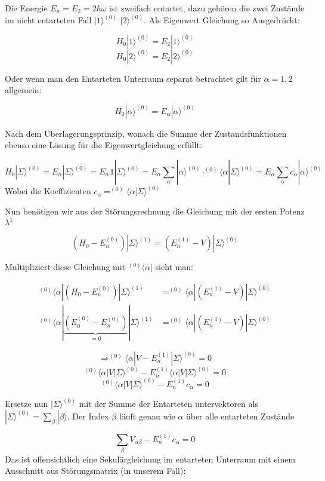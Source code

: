 Die Energie \(E_n = E_2 = 2\hbar\omega\) ist zweifach entartet, dazu gehören die zwei Zustände im nicht entarteten Fall \(|1\rangle^{(0)} \)  \(|2\rangle^{(0)} \). Als Eigenwert Gleichung so Ausgedrückt:

\[H_0 |1\rangle^{(0)} = E_2 |1\rangle^{(0)} \]
\[H_0 |2\rangle^{(0)} = E_2 |2\rangle^{(0)} \]

Oder wenn man den Entarteten Unterraum separat betrachtet gilt für \(\alpha=1,2\) allgemein:

\[H_0 |\alpha\rangle^{(0)} = E_\alpha |\alpha\rangle^{(0)} \]

Nach dem Überlagerungsprinzip, wonach die Summe der Zustandsfunktionen ebenso eine Lösung für die Eigenwertgleichung erfüllt:

\[H_0 |\Sigma \rangle^{(0)} = E_\alpha |\Sigma\rangle^{(0)} = E_\alpha \mathbb 1 |\Sigma\rangle^{(0)} =  E_\alpha \sum_\alpha |\alpha\rangle^{(0)} \cdot^{(0)}\langle \alpha |\Sigma\rangle^{(0)} = E_\alpha \sum_\alpha c_\alpha|\alpha\rangle ^{(0)} \]
Wobei die Koeffizienten \(c_\alpha =  ^{(0)} \langle \alpha |\Sigma\rangle^{(0)}\)

Nun benötigen wir aus der Störungsrechnung die Gleichung mit der ersten Potenz \(\lambda^1\)

\[(H_0-E_n^{(0)})|\Sigma\rangle ^{(1)} = (E_n^{(1)}-V)|\Sigma\rangle^{(0)}\]

Multipliziert diese Gleichung mit \(^{(0)}\langle \alpha|\) sieht man:

\begin{align}
^{(0)}\langle \alpha|(H_0-E_n^{(0)})|\Sigma\rangle ^{(1)} &= ^{(0)}\langle \alpha|(E_n^{(1)}-V)|\Sigma\rangle^{(0)}\\
^{(0)}\langle \alpha|\underbrace{(E_0^{(0)}-E_n^{(0)})}_{=0}|\Sigma\rangle ^{(1)} &=^{(0)}\langle \alpha| (E_n^{(1)}-V)|\Sigma\rangle^{(0)}
\end{align}

\[\Rightarrow  ^{(0)} \langle \alpha|V-E_n^{(1)}|\Sigma\rangle^{(0)} = 0 \]
\[  ^{(0)} \langle \alpha|V|\Sigma\rangle^{(0)} -E_n^{(1)} \langle \alpha|V|\Sigma\rangle^{(0)}  = 0 \]
\[  ^{(0)} \langle \alpha|V|\Sigma\rangle^{(0)} -E_n^{(1)} c_\alpha  = 0 \]


Ersetze nun \(|\Sigma\rangle^{(0)}\) mit der Summe der Entarteten untervektoren als \(|\Sigma\rangle^{(0)} = \sum_\beta |\beta\rangle \). Der Index \(\beta\) läuft genau wie \(\alpha\) über alle entarteten Zustände

\[\sum_\beta V_{\alpha\beta}-E_n^{(1)}c_\alpha = 0\]
Das ist offensichtlich eine Sekulärgleichung im entarteten Unterraum mit einem Ausschnitt aus Störungsmatrix (in unserem Fall):


